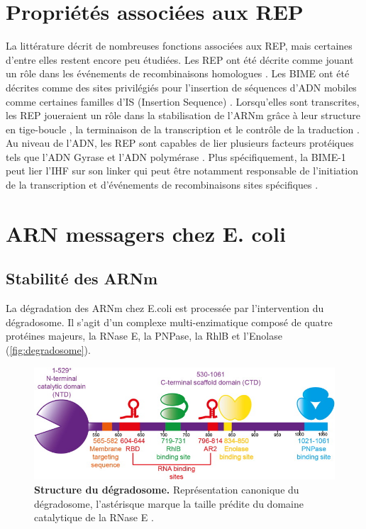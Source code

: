 \documentclass[12pt,a4paper]{report}
\begin{document}
\begin{onehalfspace}
\section*{Propriétés associées aux REP}
La littérature décrit de nombreuses fonctions associées aux REP, mais certaines d'entre elles restent encore peu étudiées. Les REP ont été décrite comme jouant un rôle dans les événements de recombinaisons homologues \citep{Kofoid2003}. Les BIME ont été décrites comme des sites privilégiés pour l'insertion de séquences d'ADN mobiles comme certaines familles d'IS (Insertion Sequence) \citep{Bachellier1997,Clement1999,Choi2003,Tobes2005}. Lorsqu'elles sont transcrites, les REP joueraient un rôle dans la stabilisation de l'ARNm grâce à leur structure en tige-boucle \citep{Newbury1987,Espeli2001,Khemici2004,Aguena2009}, la terminaison de la transcription \citep{Gilson1986} et le contrôle de la traduction \citep{Stern1988}. Au niveau de l'ADN, les REP sont capables de lier plusieurs facteurs protéiques tels que l'ADN Gyrase \citep{Espeli1997} et l'ADN polymérase \citep{Gilson1990}. Plus spécifiquement, la BIME-1 peut lier l'IHF sur son linker \citep{Boccard1993} qui peut être notamment responsable de l'initiation de la transcription et d’événements de recombinaisons sites spécifiques \citep{Goosen1995}.

\section*{ARN messagers chez E. coli}

\subsection*{Stabilité des ARNm}
La dégradation des ARNm chez E.coli est processée par l'intervention du dégradosome. Il s'agit d'un complexe multi-enzimatique composé de quatre protéines majeurs, la RNase E, la PNPase, la RhlB et l'Enolase (\autoref{fig:degradosome}).

\begin{figure}[ht]
\centerline{\includegraphics[scale=4]{figures/degradosome.jpg}}
\caption{\textbf{Structure du dégradosome.} Représentation canonique du dégradosome, l'astérisque marque la taille prédite du domaine catalytique de la RNase E \citep{Bandyra2013}.}
\label{fig:degradosome} 
\end{figure}


\end{onehalfspace}
\end{document}
